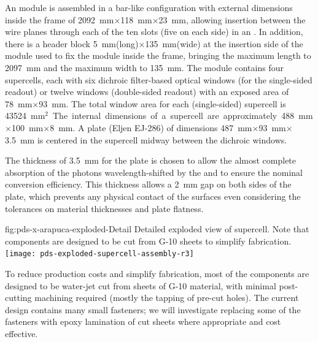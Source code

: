 An  module is assembled in a bar-like configuration with external dimensions inside the  frame of \SI{2092}{mm}$\times$\SI{118}{mm}$\times$\SI{23}{mm},  allowing insertion between the wire planes through each of the ten slots (five on each side) in an . In addition, there is a header block \SI{5}{mm}(long)$\times$\SI{135}{mm}(wide) at the insertion side of the module used to fix the module inside the  frame, bringing the maximum length to \SI{2097}{mm} and the maximum width to \SI{135}{mm}.
The module contains four  supercells, each with six dichroic filter-based optical windows (for the single-sided readout) or twelve windows (double-sided readout) with an exposed area of \SI{78}{mm}$\times$\SI{93}{mm}.  
The total window area for each (single-sided) supercell  is \SI{43524}{mm$^2$}.
The internal dimensions of a supercell are approximately \SI{488}{mm}$\times$\SI{100}{mm}$\times$\SI{8}{mm}. A  plate (Eljen EJ-286) of dimensions \SI{487}{mm}$\times$\SI{93}{mm}$\times$\SI{3.5}{mm} is centered in the supercell midway between the dichroic windows. 

The thickness of \SI{3.5}{mm} for the plate is chosen to allow the almost complete absorption of the photons wavelength-shifted by the  and to ensure the nominal conversion efficiency. This thickness allows a \SI{2}{mm}  gap on both sides of the plate, which prevents any physical contact of the surfaces even considering the tolerances on material thicknesses and plate flatness.   

\begin{dunefigure}{fig:pds-x-arapuca-exploded-Detail}
{Detailed exploded view of  supercell. Note that components are designed to be cut from \frfour G-10 sheets to simplify fabrication.}
   \texttt{[image: pds-exploded-supercell-assembly-r3]}
\end{dunefigure}

To reduce production costs and simplify fabrication, most of the  components are designed to be water-jet cut from sheets of \frfour G-10 material, with minimal post-cutting machining required (mostly the tapping of pre-cut holes).  The current design contains many small fasteners; we will investigate replacing some of the fasteners with epoxy lamination of cut sheets where appropriate and cost effective.


